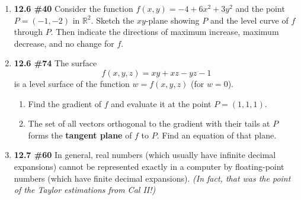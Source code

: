 \documentclass[%
]{article}
\newcommand{\vect}[1]{\mathbf{#1}}
\begin{document}
\begin{enumerate}

\vspace{1pc}
\item {\bf 12.6 \#40}
Consider the function $f(x,y)=-4+6x^2+3y^2$ and the point $P=(-1,-2)$ in $\mathbb R^2$.  Sketch the $xy$-plane showing $P$ and the level curve of $f$ through $P$.  Then indicate the directions of maximum increase, maximum decrease, and no change for $f$.

\vspace{1pc}
\item {\bf 12.6 \#74}
The surface 
\[
f(x,y,z)=xy+xz-yz-1
\]
is a level surface of the function $w=f(x,y,z)$ (for $w=0$).
\begin{enumerate}
	\item Find the gradient of $f$ and evaluate it at the point $P=(1,1,1)$.
	\item The set of all vectors orthogonal to the gradient with their tails at $P$ forms the \textbf{tangent plane} of $f$ to $P$.  Find an equation of that plane.
\end{enumerate}

\vspace{1pc}
\item {\bf 12.7 \#60}
In general, real numbers (which usually have infinite decimal expansions) cannot be represented exactly in a computer by floating-point numbers (which have finite decimal expansions).  \textit{(In fact, that was the point of the Taylor estimations from Cal II!)}


\end{enumerate}
\end{document}
